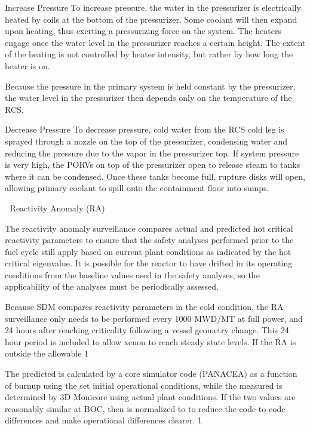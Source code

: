 \documentclass[10pt]{article}
\begin{document}
Increase Pressure
To increase pressure, the water in the pressurizer is electrically heated by coils at the bottom of the pressurizer. Some coolant will then expand upon heating, thus exerting a pressurizing force on the system. The heaters engage once the water level in the pressurizer reaches a certain height. The extent of the heating is not controlled by heater intensity, but rather by how long the heater is on. 

Because the pressure in the primary system is held constant by the pressurizer, the water level in the pressurizer then depends only on the temperature of the RCS.  

Decrease Pressure
To decrease pressure, cold water from the RCS cold leg is sprayed through a nozzle on the top of the pressurizer, condensing water and reducing the pressure due to the vapor in the pressurizer top. If system pressure is very high, the PORVs on top of the pressurizer open to release steam to tanks where it can be condensed. Once these tanks become full, rupture disks will open, allowing primary coolant to spill onto the containment floor into sumps. 


Reactivity Anomaly (RA)

The reactivity anomaly surveillance compares actual and predicted hot critical reactivity parameters to ensure that the safety analyses performed prior to the fuel cycle still apply based on current plant conditions as indicated by the hot critical eigenvalue. It is possible for the reactor to have drifted in its operating conditions from the baseline values used in the safety analyses, so the applicability of the analyses must be periodically assessed. 

Because SDM compares reactivity parameters in the cold condition, the RA surveillance only needs to be performed every 1000 MWD/MT at full power, and 24 hours after reaching criticality following a vessel geometry change. This 24 hour period is included to allow xenon to reach steady state levels. If the RA is outside the allowable  1%

The predicted  is calculated by a core simulator code (PANACEA) as a function of burnup using the set initial operational conditions, while the measured  is determined by 3D Monicore using actual plant conditions. If the two values are reasonably similar at BOC, then is normalized to  to reduce the code-to-code differences and make operational differences clearer.
  1%
\end{document}
